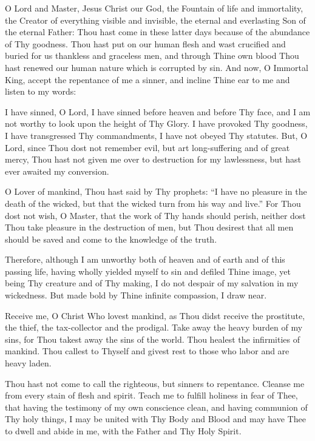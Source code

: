 O Lord and Master, Jesus Christ our God, the Fountain of life and immortality, the Creator of everything visible and invisible, the eternal and everlasting Son of the eternal Father: Thou hast come in these latter days because of the abundance of Thy goodness. Thou hast put on our human flesh and wast crucified and buried for us thankless and graceless men, and through Thine own blood Thou hast renewed our human nature which is corrupted by sin. And now, O Immortal King, accept the repentance of me a sinner, and incline Thine ear to me and listen to my words: 

I have sinned, O Lord, I have sinned before heaven and before Thy face, and I am not worthy to look upon the height of Thy Glory. I have provoked Thy goodness, I have transgressed Thy commandments, I have not obeyed Thy statutes. But, O Lord, since Thou dost not remember evil, but art long-suffering and of great mercy, Thou hast not given me over to destruction for my lawlessness, but hast ever awaited my conversion. 

O Lover of mankind, Thou hast said by Thy prophets: ``I have no pleasure in the death of the wicked, but that the wicked turn from his way and live.'' For Thou dost not wish, O Master, that the work of Thy hands should perish, neither dost Thou take pleasure in the destruction of men, but Thou desirest that all men should be saved and come to the knowledge of the truth. 

Therefore, although I am unworthy both of heaven and of earth and of this passing life, having wholly yielded myself to sin and defiled Thine image, yet being Thy creature and of Thy making, I do not despair of my salvation in my wickedness. But made bold by Thine infinite compassion, I draw near.

Receive me, O Christ Who lovest mankind, as Thou didst receive the prostitute, the thief, the tax-collector and the prodigal. Take away the heavy burden of my sins, for Thou takest away the sins of the world. Thou healest the infirmities of mankind. Thou callest to Thyself and givest rest to those who labor and are heavy laden. 

Thou hast not come to call the righteous, but sinners to repentance. Cleanse me from every stain of flesh and spirit. Teach me to fulfill holiness in fear of Thee, that having the testimony of my own conscience clean, and having communion of Thy holy things, I may be united with Thy Body and Blood and may have Thee to dwell and abide in me, with the Father and Thy Holy Spirit. 

